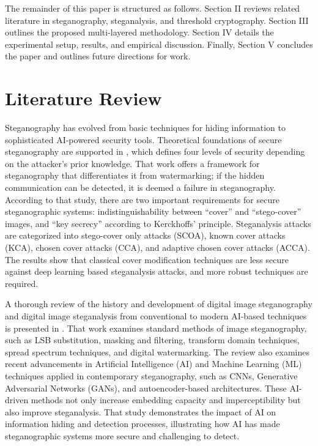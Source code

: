 \documentclass[conference]{IEEEtran}
\begin{document}
The remainder of this paper is structured as follows. Section II reviews related literature in steganography, steganalysis, and threshold cryptography. Section III outlines the proposed multi-layered methodology. Section IV details the experimental setup, results, and empirical discussion. Finally, Section V concludes the paper and outlines future directions for work.

\section{Literature Review}
Steganography has evolved from basic techniques for hiding information to sophisticated AI-powered security tools. Theoretical foundations of secure steganography are supported in \cite{keTheoretical}, which defines four levels of security depending on the attacker's prior knowledge. That work offers a framework for steganography that differentiates it from watermarking; if the hidden communication can be detected, it is deemed a failure in steganography. According to that study, there are two important requirements for secure steganographic systems: indistinguishability between ``cover'' and ``stego-cover'' images, and ``key secrecy'' according to Kerckhoffs' principle. Steganalysis attacks are categorized into stego-cover only attacks (SCOA), known cover attacks (KCA), chosen cover attacks (CCA), and adaptive chosen cover attacks (ACCA). The results show that classical cover modification techniques are less secure against deep learning based steganalysis attacks, and more robust techniques are required.

A thorough review of the history and development of digital image steganography and digital image steganalysis from conventional to modern AI-based techniques is presented in \cite{kumar2023review}. That work examines standard methods of image steganography, such as LSB substitution, masking and filtering, transform domain techniques, spread spectrum techniques, and digital watermarking. The review also examines recent advancements in Artificial Intelligence (AI) and Machine Learning (ML) techniques applied in contemporary steganography, such as CNNs, Generative Adversarial Networks (GANs), and autoencoder-based architectures. These AI-driven methods not only increase embedding capacity and imperceptibility but also improve steganalysis. That study demonstrates the impact of AI on information hiding and detection processes, illustrating how AI has made steganographic systems more secure and challenging to detect.
\end{document}
